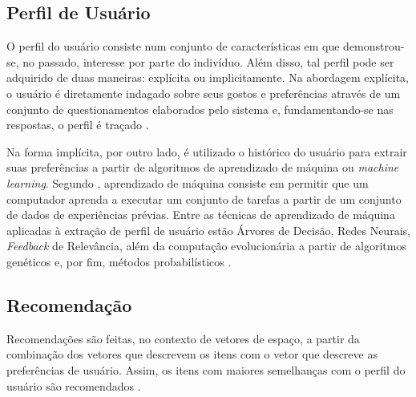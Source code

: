      
    \subsection{Perfil de Usuário}
    
    O perfil do usuário consiste num conjunto de características em que demonstrou-se, no passado, interesse por parte do indivíduo. Além disso, tal perfil pode ser adquirido de duas maneiras: explícita ou implicitamente. Na abordagem explícita, o usuário é diretamente indagado sobre seus gostos e preferências através de um conjunto de questionamentos elaborados pelo sistema e, fundamentando-se nas respostas, o perfil é traçado \cite{Adomavicius2005}.
    
    Na forma implícita, por outro lado, é utilizado o histórico do usuário para extrair suas preferências a partir de algoritmos de aprendizado de máquina ou \textit{machine learning}. Segundo , aprendizado de máquina consiste em permitir que um computador aprenda a executar um conjunto de tarefas a partir de um conjunto de dados de experiências prévias.
    Entre as técnicas de aprendizado de máquina aplicadas à extração de perfil de usuário estão Árvores de Decisão, Redes Neurais, \textit{Feedback} de Relevância, além da computação evolucionária a partir de algoritmos genéticos e, por fim,  métodos probabilísticos \cite{Ricci2010}.
   
    \subsection{Recomendação}
    
    Recomendações são feitas, no contexto de vetores de espaço, a partir da combinação dos vetores que descrevem os itens com o vetor que descreve as preferências de usuário. Assim, os itens com maiores semelhanças com o perfil do usuário são recomendados \cite{Aggarwal2016}.

            
